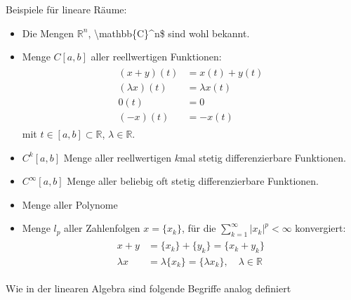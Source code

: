 \documentclass[letterpaper,10pt,english]{jupyterBook}
\begin{document}
Beispiele für lineare Räume:
\begin{itemize}
\item {} 
Die Mengen \(\mathbb{R}^n\), \textbackslash{}mathbb\{C\}\textasciicircum{}n\$ sind wohl bekannt.

\item {} 
Menge \(C[a,b]\) aller reellwertigen  Funktionen:
\begin{equation*}
\begin{split}\begin{split}
  (x+y)(t) & = x(t) + y(t)\\
  (\lambda x)(t) & = \lambda x(t)\\
  0(t) & = 0\\
  (-x)(t) & = -x(t) \end{split}\end{split}
\end{equation*}
mit \(t \in [a,b]\subset \mathbb{R}\), \(\lambda\in\mathbb{R}\).

\item {} 
\(C^k[a,b]\) Menge aller reellwertigen \(k\)\sphinxhyphen{}mal stetig differenzierbare Funktionen.

\item {} 
\(C^{\infty}[a,b]\) Menge aller beliebig oft stetig differenzierbare Funktionen.

\item {} 
Menge aller Polynome

\item {} 
Menge \(l_p\) aller Zahlenfolgen \(x = \{x_k\}\), für die \(\sum_{k=1}^{\infty} |x_k|^p < \infty\) konvergiert:
\begin{equation*}
\begin{split}\begin{split}
  x+y & = \{x_k\} + \{y_k\} = \{x_k + y_k\}\\
  \lambda x & = \lambda \{x_k\} = \{\lambda x_k\},\quad \lambda\in\mathbb{R}\end{split}\end{split}
\end{equation*}
\end{itemize}

Wie in der linearen Algebra sind folgende Begriffe analog definiert
\end{document}
